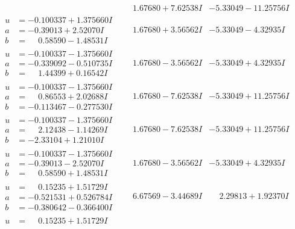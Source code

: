 \documentclass[1p]{elsarticle_modified}
\theoremstyle{definition}
\begin{document}
$$\begin{array}{c|c|c}
 & \phantom{-}1.67680 + 7.62538 I & -5.33049 - 11.25756 I \\ \hline\begin{aligned}
u &= -0.100337 + 1.375660 I \\
a &= -0.39013 + 2.52070 I \\
b &= \phantom{-}0.58590 - 1.48531 I\end{aligned}
 & \phantom{-}1.67680 + 3.56562 I & -5.33049 - 4.32935 I \\ \hline\begin{aligned}
u &= -0.100337 - 1.375660 I \\
a &= -0.339092 - 0.510735 I \\
b &= \phantom{-}1.44399 + 0.16542 I\end{aligned}
 & \phantom{-}1.67680 - 3.56562 I & -5.33049 + 4.32935 I \\ \hline\begin{aligned}
u &= -0.100337 - 1.375660 I \\
a &= \phantom{-}0.86553 + 2.02688 I \\
b &= -0.113467 - 0.277530 I\end{aligned}
 & \phantom{-}1.67680 - 7.62538 I & -5.33049 + 11.25756 I \\ \hline\begin{aligned}
u &= -0.100337 - 1.375660 I \\
a &= \phantom{-}2.12438 - 1.14269 I \\
b &= -2.33104 + 1.21010 I\end{aligned}
 & \phantom{-}1.67680 - 7.62538 I & -5.33049 + 11.25756 I \\ \hline\begin{aligned}
u &= -0.100337 - 1.375660 I \\
a &= -0.39013 - 2.52070 I \\
b &= \phantom{-}0.58590 + 1.48531 I\end{aligned}
 & \phantom{-}1.67680 - 3.56562 I & -5.33049 + 4.32935 I \\ \hline\begin{aligned}
u &= \phantom{-}0.15235 + 1.51729 I \\
a &= -0.521531 + 0.526784 I \\
b &= -0.380642 - 0.366400 I\end{aligned}
 & \phantom{-}6.67569 - 3.44689 I & \phantom{-}2.29813 + 1.92370 I \\ \hline\begin{aligned}
u &= \phantom{-}0.15235 + 1.51729 I \\

\end{aligned}
\end{array}$$
\end{document}
